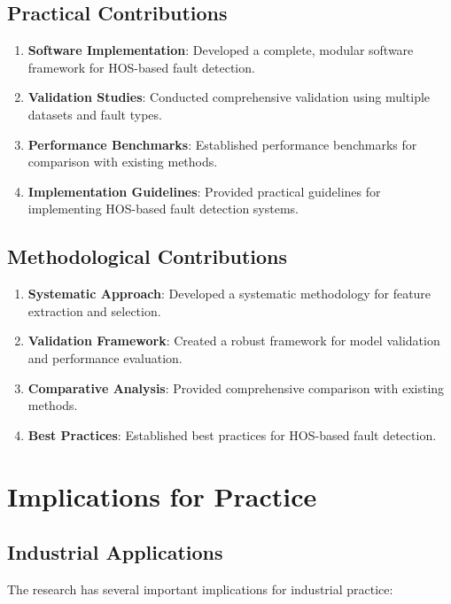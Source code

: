 \subsection{Practical Contributions}

\begin{enumerate}
    \item \textbf{Software Implementation}: Developed a complete, modular software framework for HOS-based fault detection.
    \item \textbf{Validation Studies}: Conducted comprehensive validation using multiple datasets and fault types.
    \item \textbf{Performance Benchmarks}: Established performance benchmarks for comparison with existing methods.
    \item \textbf{Implementation Guidelines}: Provided practical guidelines for implementing HOS-based fault detection systems.
\end{enumerate}

\subsection{Methodological Contributions}

\begin{enumerate}
    \item \textbf{Systematic Approach}: Developed a systematic methodology for feature extraction and selection.
    \item \textbf{Validation Framework}: Created a robust framework for model validation and performance evaluation.
    \item \textbf{Comparative Analysis}: Provided comprehensive comparison with existing methods.
    \item \textbf{Best Practices}: Established best practices for HOS-based fault detection.
\end{enumerate}

\section{Implications for Practice}

\subsection{Industrial Applications}

The research has several important implications for industrial practice:

